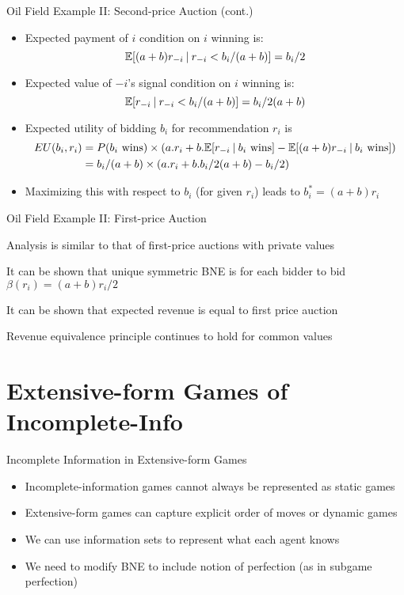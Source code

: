 \documentclass[11pt,aspectratio=169]{beamer}
\begin{document}
  
  \begin{frame}{Oil Field Example II: Second-price Auction (cont.)}
   \begin{itemize}
    \item Expected payment of $i$ condition on $i$ winning is:
    $$\mathbb{E}[(a+b)r_{-i}  \:\vert\:  r_{-i} < b_i/(a+b)] = b_i/2$$
    \item Expected value of $-i$'s signal condition on $i$ winning is:
    $$\mathbb{E}[r_{-i}  \:\vert\:  r_{-i} < b_i/(a+b)] = b_i/2(a + b)$$
    \item Expected utility of bidding $b_i$ for recommendation $r_i$ is
    \begin{align*}
     EU(b_i, r_i) & = P(b_i \text{ wins}) \times \left(a.r_i + b.\mathbb{E}[r_{-i}  \:\vert\:  b_i \text{ wins}] - \mathbb{E}[(a+b)r_{-i}  \:\vert\:  b_i \text{ wins}]\right) \\
     & = b_i/(a + b) \times (a.r_i + b.b_i/2(a + b) - b_i/2) 
    \end{align*}
    \item Maximizing this with respect to $b_i$ (for given $r_i$) leads to $b_i^* = (a + b) r_i$
   \end{itemize}
  \end{frame}

  \begin{frame}{Oil Field Example II: First-price Auction}
   \begin{itemizes}
    \item Analysis is similar to that of first-price auctions with private values
    \item It can be shown that unique symmetric BNE is for each bidder to bid $\beta(r_i)=(a+b)r_i/2$ 
    \item It can be shown that expected revenue is equal to first price auction
    \item Revenue equivalence principle \alert{continues to hold} for common values  
   \end{itemizes}
  \end{frame}
  
  
 \section{Extensive-form Games of Incomplete-Info}
 
  \begin{frame}{Incomplete Information in Extensive-form Games}
   \begin{itemize}[<+->]
   \setlength{\itemsep}{1.3em}
    \item Incomplete-information games cannot always be represented as \alert{static games}
    \item Extensive-form games can capture explicit order of moves or \alert{dynamic games}
    \item We can use \alert{information sets} to represent what each agent knows
    \item We need to modify BNE to include notion of \alert{perfection} (as in subgame perfection)
   \end{itemize}
  \end{frame}
\end{document}
